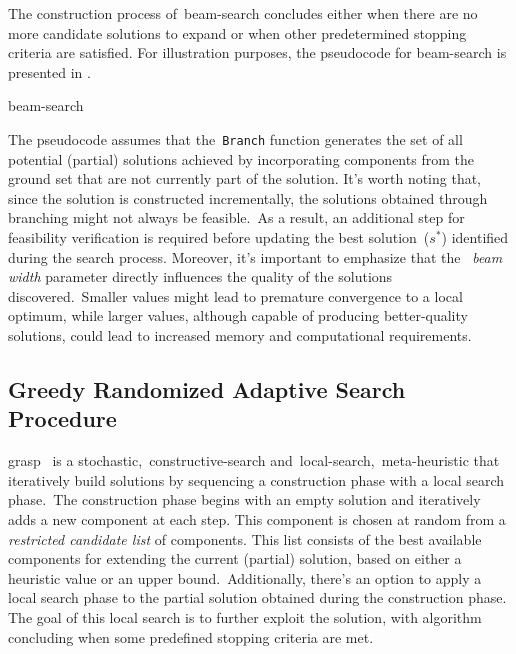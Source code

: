 The construction process of~\acrshort{beam-search} concludes either when there
are no more candidate solutions to expand or when other predetermined stopping
criteria are satisfied. For illustration purposes, the pseudocode for
\acrshort{beam-search} is presented in .

\begin{algorithm}
  
  \caption{\acrlong{beam-search}}
  \label{algorithm:beam-search}
\end{algorithm}

The pseudocode assumes that the~\texttt{Branch} function generates the set of
all potential (partial) solutions achieved by incorporating components from the
ground set that are not currently part of the solution. It's worth noting that,
since the solution is constructed incrementally, the solutions obtained through
branching might not always be feasible.~As a result, an additional step for
feasibility verification is required before updating the best solution~($s^{*}$)
identified during the search process. Moreover, it's important to emphasize that
the ~\emph{beam width} parameter directly influences the quality of the
solutions discovered.~Smaller values might lead to premature convergence to a
local optimum, while larger values, although capable of producing better-quality
solutions, could lead to increased memory and computational requirements.

\subsection{Greedy Randomized Adaptive Search Procedure}
\label{subsec:grasp}

\acrfull{grasp}~\cite{resende2010greedya,outeiro2021application,blum2003metaheuristics}
is a stochastic,~\acrshort{constructive-search}
and~\acrshort{local-search},~\acrshort{meta-heuristic} that iteratively build
solutions by sequencing a construction phase with a local search phase.~The
construction phase begins with an empty solution and iteratively adds a new
component at each step. This component is chosen at random from a
\emph{restricted candidate list} of components. This list consists of the best
available components for extending the current (partial) solution, based on
either a heuristic value or an upper bound.~Additionally, there's an option to
apply a local search phase to the partial solution obtained during the
construction phase. The goal of this local search is to further exploit the
solution, with algorithm concluding when some predefined stopping criteria are
met.

